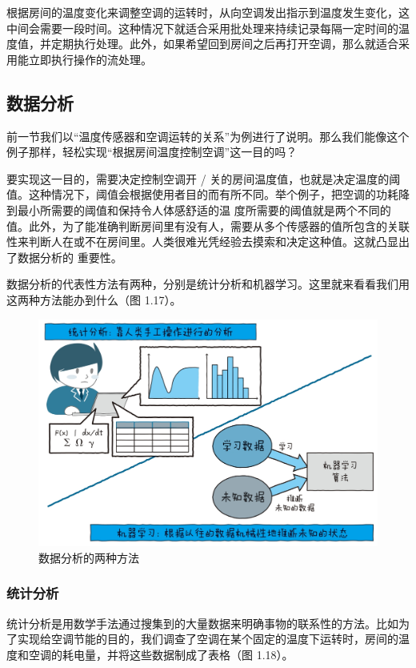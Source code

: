 \documentclass[12pt,UTF8]{ctexbook}
\begin{document}
根据房间的温度变化来调整空调的运转时，从向空调发出指示到温度发生变化，这中间会需要一段时间。这种情况下就适合采用批处理来持续记录每隔一定时间的温度值，并定期执行处理。此外，如果希望回到房间之后再打开空调，那么就适合采用能立即执行操作的流处理。

\subsection{数据分析}

前一节我们以“温度传感器和空调运转的关系”为例进行了说明。那么我们能像这个例子那样，轻松实现“根据房间温度控制空调”这一目的吗？

要实现这一目的，需要决定控制空调开 / 关的房间温度值，也就是决定温度的阈值。这种情况下，阈值会根据使用者目的而有所不同。举个例子，把空调的功耗降到最小所需要的阈值和保持令人体感舒适的温
度所需要的阈值就是两个不同的值。此外，为了能准确判断房间里有没有人，需要从多个传感器的值所包含的关联性来判断人在或不在房间里。人类很难光凭经验去摸索和决定这种值。这就凸显出了数据分析的
重要性。

数据分析的代表性方法有两种，分别是统计分析和机器学习。这里就来看看我们用这两种方法能办到什么（图 1.17）。

\begin{figure}[htbp]
	\centering
	\includegraphics[width=1\linewidth]{17}
	\caption{数据分析的两种方法}
	\label{fig:1}
\end{figure}

\subsubsection{统计分析}

统计分析是用数学手法通过搜集到的大量数据来明确事物的联系性的方法。比如为了实现给空调节能的目的，我们调查了空调在某个固定的温度下运转时，房间的温度和空调的耗电量，并将这些数据制成了表格（图 1.18）。
\end{document}
